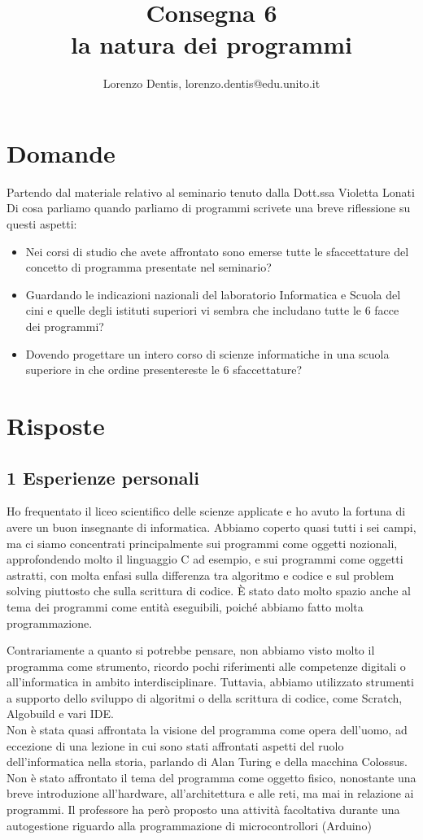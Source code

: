 \documentclass[a4paper]{article}
\begin{document}
\author{Lorenzo Dentis, lorenzo.dentis@edu.unito.it}
\title{Consegna 6 \\ \large la natura dei programmi}
\maketitle

\section{Domande}
Partendo dal materiale relativo al seminario tenuto dalla Dott.ssa Violetta Lonati Di cosa parliamo quando parliamo di programmi scrivete una breve riflessione su questi aspetti:
\begin{itemize}
	\item Nei corsi di studio che avete affrontato sono emerse tutte le sfaccettature del concetto di programma presentate nel seminario?
	\item Guardando le indicazioni nazionali del laboratorio Informatica e Scuola del cini e quelle degli istituti superiori vi sembra che includano tutte le 6 facce dei programmi?
	\item Dovendo progettare un intero corso di scienze informatiche in una scuola superiore in che ordine presentereste le 6 sfaccettature?
\end{itemize}
\section{Risposte}
\subsection{1 Esperienze personali}
Ho frequentato il liceo scientifico delle scienze applicate e ho avuto la fortuna di avere un buon insegnante di informatica. 
Abbiamo coperto quasi tutti i sei campi, ma ci siamo concentrati principalmente sui programmi come oggetti nozionali, approfondendo molto il linguaggio C ad esempio, e sui programmi come oggetti astratti, con molta enfasi sulla differenza tra algoritmo e codice e sul problem solving piuttosto che sulla scrittura di codice.
È stato dato molto spazio anche al tema dei programmi come entità eseguibili, poiché abbiamo fatto molta programmazione.


Contrariamente a quanto si potrebbe pensare, non abbiamo visto molto il programma come strumento, ricordo pochi riferimenti alle competenze digitali o all'informatica in ambito interdisciplinare. Tuttavia, abbiamo utilizzato strumenti a supporto dello sviluppo di algoritmi o della scrittura di codice, come Scratch, Algobuild e vari IDE.\\
Non è stata quasi affrontata la visione del programma come opera dell'uomo, ad eccezione di una lezione in cui sono stati affrontati aspetti del ruolo dell'informatica nella storia, parlando di Alan Turing e della macchina Colossus. 
Non è stato affrontato il tema del programma come oggetto fisico, nonostante una breve introduzione all'hardware, all'architettura e alle reti, ma mai in relazione ai programmi.
Il professore ha però proposto una attività facoltativa durante una autogestione riguardo alla programmazione di microcontrollori (Arduino)
\end{document}
